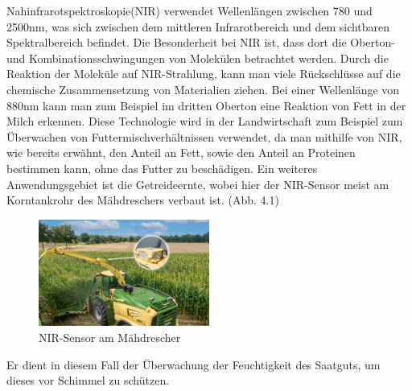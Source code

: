 Nahinfrarotspektroskopie(NIR) verwendet Wellenlängen zwischen 780 und 2500nm,
was sich zwischen dem mittleren Infrarotbereich und dem sichtbaren
Spektralbereich befindet. Die Besonderheit bei NIR ist, dass dort die
Oberton-und Kombinationsschwingungen von Molekülen betrachtet werden.
\cite{shenk2001application} Durch die Reaktion der Moleküle auf NIR-Strahlung,
kann man viele Rückschlüsse auf die chemische Zusammensetzung von Materialien
ziehen. Bei einer Wellenlänge von 880nm kann man zum Beispiel im dritten
Oberton eine Reaktion von Fett in der Milch erkennen. \cite{cen2007theory}
Diese Technologie wird in der Landwirtschaft zum Beispiel zum Überwachen von
Futtermischverhältnissen verwendet, da man mithilfe von NIR, wie bereits
erwähnt, den Anteil an Fett, sowie den Anteil an Proteinen bestimmen kann, ohne
das Futter zu beschädigen. Ein weiteres Anwendungsgebiet ist die Getreideernte,
wobei hier der NIR-Sensor meist am Korntankrohr des Mähdreschers verbaut ist.
(Abb. 4.1) 

\begin{figure}[ht]
	\centering
	\includegraphics[width=0.5\textwidth]{bilder/Krone NIR Control dual.jpg}
	\caption[Sprühdrohne]{NIR-Sensor am Mähdrescher}
	\label{fig:Mähdrescher NIR-Sensor}
\end{figure}

Er dient in diesem Fall der Überwachung der Feuchtigkeit des Saatguts,
um dieses vor Schimmel zu schützen.